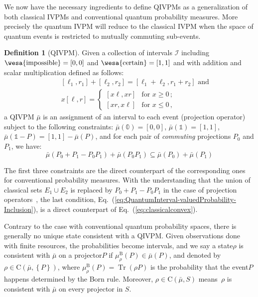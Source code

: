 \documentclass[english,reprint, aps, prl,superscriptaddress, showpacs,
showkeys, longbibliography, amsmath, amssymb]{revtex4-1}
\theoremstyle{plain}
\theoremstyle{definition}
\newtheorem{definition}[thm]{Definition}
\newcommand{\imposs}{{\text{\wesa{impossible}}}}
\newcommand{\necess}{{\text{\wesa{certain}}}}
\newcommand{\Tr}{\ensuremath{\mathop{\mathrm{Tr}}\nolimits}}
\newcommand{\coreBorn}{\ensuremath{\mathrm{C}}}
\newcommand{\nb}{\nolinebreak[1] }
\begin{document}
We now have the necessary ingredients to define QIVPMs as a
generalization of both classical IVPMs and conventional quantum
probability measures. More precisely the quantum IVPM will reduce to
the classical IVPM when the space of quantum events is restricted to
mutually commuting sub-events.

\begin{definition}[QIVPM]
  Given a collection of intervals $\mathscr{I}$ including
  $\imposs=[0,0]$ and $\necess=[1,1]$ and with addition and scalar
  multiplication defined as follows:
  \begin{subequations}\label{eq:interval-operations}
  \begin{eqnarray}
   &  & [\ell_{1},r_{1}]+[\ell_{2},r_{2}]=[\ell_{1}+\ell_{2},r_{1}+r_{2}]\textrm{ and}\\
   &  & x[\ell,r]=\begin{cases}
  [x\ell,xr] & \textrm{for }x\ge0\,;\\{}
  [xr,x\ell] & \textrm{for }x\le0\,,
  \end{cases}
  \end{eqnarray}
  \end{subequations}
  a QIVPM $\bar{\mu}$ is an assignment of an interval to each event
  (projection operator) subject to the following constraints:
  $\bar{\mu}(\mathbb{0})=\left[0,0\right]$,
  $\bar{\mu}(\mathbb{1})=\left[1,1\right]$,
  $\bar{\mu}\left(\mathbb{1}-P\right)=\left[1,1\right]-\bar{\mu}\left(P\right)$,
  and for each pair of \emph{commuting} projections $P_0$ and $P_1$,
  we have:
\begin{equation}
\bar{\mu}\left(P_{0}+P_{1}-P_{0}P_{1}\right)+\bar{\mu}\left(P_{0}P_{1}\right)\subseteq\bar{\mu}\left(P_{0}\right)+\bar{\mu}\left(P_{1}\right)
\label{eq:QuantumInterval-valuedProbability-Inclusion}
\end{equation}
\end{definition}
The first three constraints are the direct counterpart of the
corresponding ones for conventional probability measures. With the
understanding that the union of classical sets $E_1\cup E_2$ is replaced
by $P_0+P_1-P_0P_1$ in the case of projection operators~\cite{Griffiths2003}, the last
condition, Eq.~(\ref{eq:QuantumInterval-valuedProbability-Inclusion}), is
a direct counterpart of Eq.~(\ref{eq:classicalconvex}).

Contrary to the case with conventional quantum probability spaces,
there is generally no unique state consistent with a QIVPM. Given
observations done with finite resources, the probabilities become
intervals, and we say a state\nb$\rho$ is consistent with $\bar{\mu}$ on
a projector\nb$P$ if
$\mu_{\rho}^{\mathrm{B}}\left(P\right)\in\bar{\mu}\left(P\right)$, and
denoted by
$\rho\in\coreBorn\left(\bar{\mu},\left\{ P\right\} \right)$,
where $\mu_{\rho}^{\mathrm{B}}\left(P\right)=\Tr\left(\rho P\right)$
is the probability that the event\nb$P$ happens determined by the
Born rule\nb\cite{Born1983,peres1995quantum,544199}.
Moreover, $\rho\in\coreBorn\left(\bar{\mu},S\right)$ means~$\rho$ is
consistent with $\bar{\mu}$ on every projector in $S$.
\end{document}
